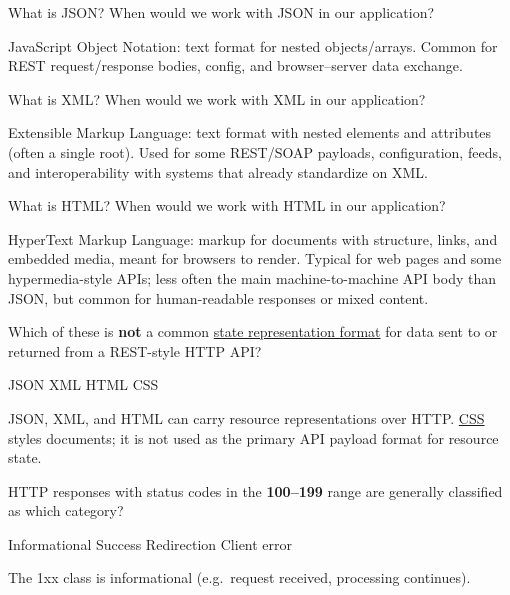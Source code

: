 \question[4]
What is JSON? When would we work with JSON in our application?
\begin{solutionorbox}[1.00in]
  JavaScript Object Notation: text format for nested objects/arrays. Common for REST request/response bodies, config, and browser--server data exchange.
\end{solutionorbox}

\question[4]
What is XML? When would we work with XML in our application?
\begin{solutionorbox}[1.00in]
  Extensible Markup Language: text format with nested elements and attributes (often a single root). Used for some REST/SOAP payloads, configuration, feeds, and interoperability with systems that already standardize on XML.
\end{solutionorbox}


\question[4]
What is HTML? When would we work with HTML in our application?
\begin{solutionorbox}[1.00in]
  HyperText Markup Language: markup for documents with structure, links, and embedded media, meant for browsers to render. Typical for web pages and some hypermedia-style APIs; less often the main machine-to-machine API body than JSON, but common for human-readable responses or mixed content.
\end{solutionorbox}


\newpage

\question[4]
Which of these is \textbf{not} a common \uline{state representation format} for data sent to or returned from a REST-style HTTP API?
\begin{choices}
  \choice JSON
  \choice XML
  \choice HTML
  \CorrectChoice CSS
\end{choices}
\begin{solution}
  JSON, XML, and HTML can carry resource representations over HTTP. 
  \uline{CSS} styles documents; 
  it is not used as the primary API payload format for resource state.
\end{solution}

\question[4]
HTTP responses with status codes in the \textbf{100--199} range are generally classified as which category?
\begin{choices}
  \CorrectChoice Informational
  \choice Success
  \choice Redirection
  \choice Client error
\end{choices}
\begin{solution}
  The 1xx class is informational (e.g.\ request received, processing continues).
\end{solution}

